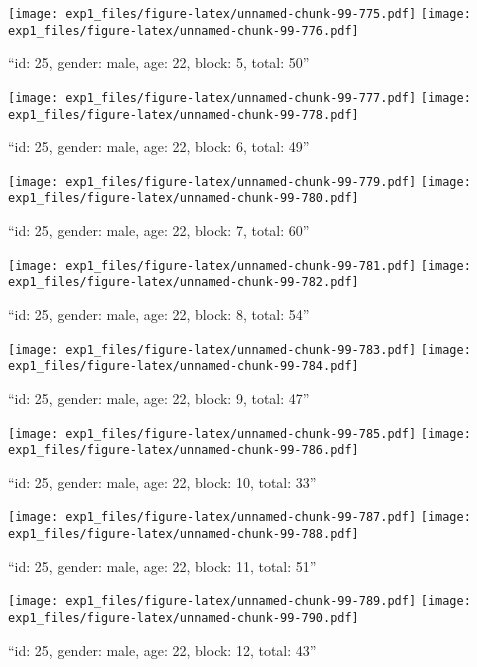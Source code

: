 \documentclass[,]{article}
\begin{document}
\texttt{[image: exp1\_files/figure-latex/unnamed-chunk-99-775.pdf]}
\texttt{[image: exp1\_files/figure-latex/unnamed-chunk-99-776.pdf]}

\newpage
[1] 

``id: 25, gender: male, age: 22, block: 5, total: 50''

\texttt{[image: exp1\_files/figure-latex/unnamed-chunk-99-777.pdf]}
\texttt{[image: exp1\_files/figure-latex/unnamed-chunk-99-778.pdf]}

\newpage
[1] 

``id: 25, gender: male, age: 22, block: 6, total: 49''

\texttt{[image: exp1\_files/figure-latex/unnamed-chunk-99-779.pdf]}
\texttt{[image: exp1\_files/figure-latex/unnamed-chunk-99-780.pdf]}

\newpage
[1] 

``id: 25, gender: male, age: 22, block: 7, total: 60''

\texttt{[image: exp1\_files/figure-latex/unnamed-chunk-99-781.pdf]}
\texttt{[image: exp1\_files/figure-latex/unnamed-chunk-99-782.pdf]}

\newpage
[1] 

``id: 25, gender: male, age: 22, block: 8, total: 54''

\texttt{[image: exp1\_files/figure-latex/unnamed-chunk-99-783.pdf]}
\texttt{[image: exp1\_files/figure-latex/unnamed-chunk-99-784.pdf]}

\newpage
[1] 

``id: 25, gender: male, age: 22, block: 9, total: 47''

\texttt{[image: exp1\_files/figure-latex/unnamed-chunk-99-785.pdf]}
\texttt{[image: exp1\_files/figure-latex/unnamed-chunk-99-786.pdf]}

\newpage
[1] 

``id: 25, gender: male, age: 22, block: 10, total: 33''

\texttt{[image: exp1\_files/figure-latex/unnamed-chunk-99-787.pdf]}
\texttt{[image: exp1\_files/figure-latex/unnamed-chunk-99-788.pdf]}

\newpage
[1] 

``id: 25, gender: male, age: 22, block: 11, total: 51''

\texttt{[image: exp1\_files/figure-latex/unnamed-chunk-99-789.pdf]}
\texttt{[image: exp1\_files/figure-latex/unnamed-chunk-99-790.pdf]}

\newpage
[1] 

``id: 25, gender: male, age: 22, block: 12, total: 43''
\end{document}
